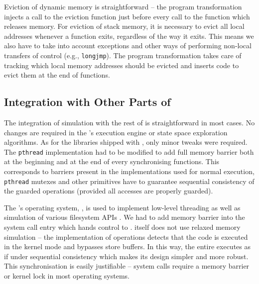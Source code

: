 Eviction of dynamic memory is straightforward -- the program transformation injects a call to the eviction function just before every call to the function which releases memory.
For eviction of stack memory, it is necessary to evict all local addresses whenever a function exits, regardless of the way it exits.
This means we also have to take into account exceptions and other ways of performing non-local transfers of control (e.g., \texttt{longjmp}).
The program transformation takes care of tracking which local memory addresses should be evicted and inserts code to evict them at the end of functions.

\subsection{Integration with Other Parts of \divine}

The integration of \xtso simulation with the rest of \divine is straightforward in most cases.
No changes are required in the \divine's execution engine or state space exploration algorithms.
As for the libraries shipped with \divine, only minor tweaks were required.
The \texttt{pthread} implementation had to be modified to add full memory barrier both at the beginning and at the end of every synchronising functions.
This corresponds to barriers present in the implementations used for normal execution, \texttt{pthread} mutexes and other primitives have to guarantee sequential consistency of the guarded operations (provided all accesses are properly guarded).

The \divine's operating system, \dios, is used to implement low-level threading as well as simulation of various filesystem APIs .
We had to add memory barrier into the system call entry which hands control to \dios.
\dios itself does not use relaxed memory simulation -- the implementation of \xtso operations detects that the code is executed in the kernel mode and bypasses store buffers.
In this way, the entire \dios executes as if under sequential consistency which makes its design simpler and more robust.
This synchronisation is easily justifiable -- system calls require a memory barrier or kernel lock in most operating systems.

